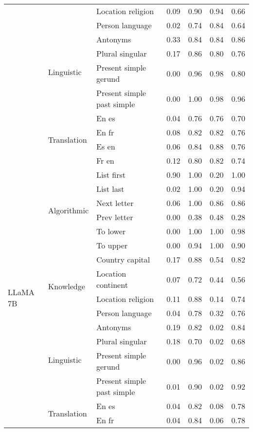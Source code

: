 \begin{center}
\begin{longtable}{lllrrrr}
 &  & Location religion & 0.09 & 0.90 & 0.94 & 0.66 \\
 &  & Person language & 0.02 & 0.74 & 0.84 & 0.64 \\
\cline{2-7}
 & \multirow[t]{4}{*}{Linguistic} & Antonyms & 0.33 & 0.84 & 0.84 & 0.86 \\
 &  & Plural singular & 0.17 & 0.86 & 0.80 & 0.76 \\
 &  & Present simple gerund & 0.00 & 0.96 & 0.98 & 0.80 \\
 &  & Present simple past simple & 0.00 & 1.00 & 0.98 & 0.96 \\
\cline{2-7}
 & \multirow[t]{4}{*}{Translation} & En es & 0.04 & 0.76 & 0.76 & 0.70 \\
 &  & En fr & 0.08 & 0.82 & 0.82 & 0.76 \\
 &  & Es en & 0.06 & 0.84 & 0.88 & 0.76 \\
 &  & Fr en & 0.12 & 0.80 & 0.82 & 0.74 \\
\cline{1-7} \cline{2-7}
\multirow[t]{18}{*}{LLaMA 7B} & \multirow[t]{6}{*}{Algorithmic} & List first & 0.90 & 1.00 & 0.20 & 1.00 \\
 &  & List last & 0.02 & 1.00 & 0.20 & 0.94 \\
 &  & Next letter & 0.06 & 1.00 & 0.86 & 0.86 \\
 &  & Prev letter & 0.00 & 0.38 & 0.48 & 0.28 \\
 &  & To lower & 0.00 & 1.00 & 1.00 & 0.98 \\
 &  & To upper & 0.00 & 0.94 & 1.00 & 0.90 \\
\cline{2-7}
 & \multirow[t]{4}{*}{Knowledge} & Country capital & 0.17 & 0.88 & 0.54 & 0.82 \\
 &  & Location continent & 0.07 & 0.72 & 0.44 & 0.56 \\
 &  & Location religion & 0.11 & 0.88 & 0.14 & 0.74 \\
 &  & Person language & 0.04 & 0.78 & 0.32 & 0.76 \\
\cline{2-7}
 & \multirow[t]{4}{*}{Linguistic} & Antonyms & 0.19 & 0.82 & 0.02 & 0.84 \\
 &  & Plural singular & 0.18 & 0.70 & 0.02 & 0.68 \\
 &  & Present simple gerund & 0.00 & 0.96 & 0.02 & 0.86 \\
 &  & Present simple past simple & 0.01 & 0.90 & 0.02 & 0.92 \\
\cline{2-7}
 & \multirow[t]{4}{*}{Translation} & En es & 0.04 & 0.82 & 0.08 & 0.78 \\
 &  & En fr & 0.04 & 0.84 & 0.06 & 0.78 \\

\end{longtable}
\end{center}
